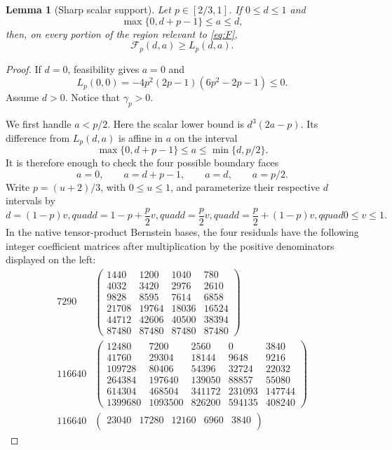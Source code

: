 \documentclass[11pt]{article}
\newtheorem{lemma}[theorem]{Lemma}
\begin{document}
\begin{lemma}[Sharp scalar support]\label{lem:scalar}
Let $p\in[2/3,1]$.  If $0\le d\le1$ and
\[
 \max\{0,d+p-1\}\le a\le d,
\]
then, on every portion of the region relevant to \eqref{eq:F},
\begin{equation}
 \mathcal F_p(d,a)\ge L_p(d,a).
 \label{eq:support}
\end{equation}
\end{lemma}

\begin{proof}
If $d=0$, feasibility gives $a=0$ and
\[
 L_p(0,0)=-4p^2(2p-1)(6p^2-2p-1)\le0.
\]
Assume $d>0$.  Notice that $\gamma_p>0$.

We first handle $a<p/2$.  Here the scalar lower bound is
$d^3(2a-p)$.  Its difference from $L_p(d,a)$ is affine in $a$ on the
interval
\[
 \max\{0,d+p-1\}\le a\le\min\{d,p/2\}.
\]
It is therefore enough to check the four possible boundary faces
\[
 a=0,\qquad a=d+p-1,\qquad a=d,\qquad a=p/2.
\]
Write $p=(u+2)/3$, with $0\le u\le1$, and parameterize their respective
$d$ intervals by
\[
 d=(1-p)v,quad
 d=1-p+\frac p2v,quad
 d=\frac p2v,quad
 d=\frac p2+(1-p)v,qquad 0\le v\le1.
\]
In the native tensor-product Bernstein bases, the four residuals have the
following integer coefficient matrices after multiplication by the positive
denominators displayed on the left:
\[
\begin{array}{c|c}
7290&
\begin{pmatrix}
1440&1200&1040&780\\
4032&3420&2976&2610\\
9828&8595&7614&6858\\
21708&19764&18036&16524\\
44712&42606&40500&38394\\
87480&87480&87480&87480
\end{pmatrix}
\\[18pt]
116640&
\begin{pmatrix}
12480&7200&2560&0&3840\\
41760&29304&18144&9648&9216\\
109728&80406&54396&32724&22032\\
264384&197640&139050&88857&55080\\
614304&468504&341172&231093&147744\\
1399680&1093500&826200&594135&408240
\end{pmatrix}
\\[18pt]
116640&
\begin{pmatrix}
23040&17280&12160&6960&3840\\

\end{pmatrix}
\end{array}\]
\end{proof}
\end{document}
